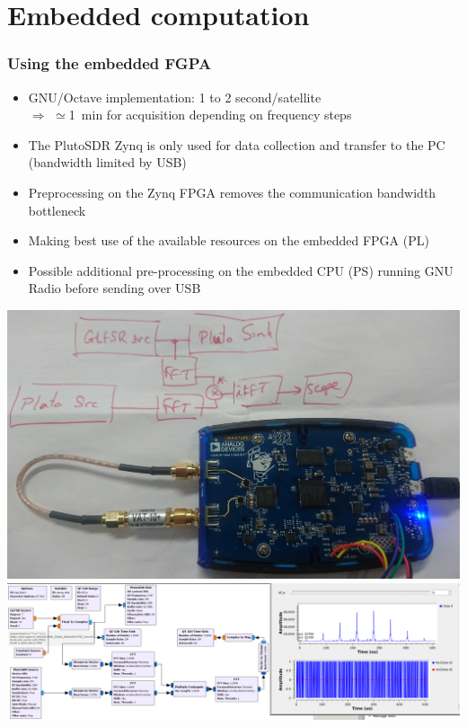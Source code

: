 \documentclass[compress,10pt]{beamer}
\begin{document}
\section{Embedded computation}
\begin{frame}[fragile]\frametitle{Using the embedded FGPA}

\begin{itemize}
\item
GNU/Octave implementation: 1 to 2 second/satellite \\
$\Rightarrow$ $\simeq$1~min for acquisition depending on frequency steps
\item The PlutoSDR Zynq is only used for data collection and transfer to the PC (bandwidth
limited by USB)
\item Preprocessing on the Zynq FPGA removes the communication bandwidth bottleneck
\item Making best use of the available resources on the embedded FPGA (PL)
\item Possible additional pre-processing on the embedded CPU (PS) running GNU Radio before sending
over USB
\end{itemize}

\includegraphics[width=.31\linewidth]{DSC_0275.JPG}
\includegraphics[width=.68\linewidth]{xcorr_pluto2}
\end{frame}
\end{document}
